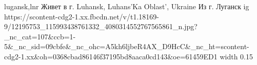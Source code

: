  
 
 
 
 

\par
lugansk,lnr
Живет в г. Luhansk, Luhans'Ka Oblast', Ukraine
Из г. Луганск
\ifcmt
  ig https://scontent-cdg2-1.xx.fbcdn.net/v/t1.18169-9/12195753_115993438761332_4080314552767565861_n.jpg?_nc_cat=107&ccb=1-5&_nc_sid=09cbfe&_nc_ohc=A5kh6ljbeR4AX_D9HcC&_nc_ht=scontent-cdg2-1.xx&oh=0368cbad86146f37195bd8aaca0cd143&oe=61459ED1
  width 0.15
\fi


